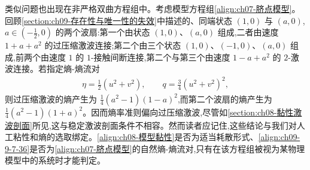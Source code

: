 \documentclass[../../main.tex]{subfiles}
\begin{document}
类似问题也出现在非严格双曲方程组中。考虑模型方程组\eqref{align:ch07-脐点模型}。回顾\cref{section:ch09-存在性与唯一性的失效}中描述的、同端状态 $(1,0)$ 与 $(a,0)$, $a\in(-\frac{1}{2},0)$ 的两个波扇:第一个由状态 $(1,0)$、$(a,0)$ 组成,二者由速度 $1+a+a^{2}$ 的过压缩激波连接;第二个由三个状态 $(1,0)$、$(-1,0)$、$(a,0)$ 组成,前两个由速度 $1$ 的 $1$-接触间断连接,第二个与第三个由速度 $1-a+a^{2}$ 的 $2$-激波连接。若指定熵-熵流对
\begin{align}
\eta=\tfrac{1}{2}(u^{2}+v^{2}),\qquad q=\tfrac{3}{4}(u^{2}+v^{2})^{2},
\label{align:ch09-9-7-36}
\end{align}
则过压缩激波的熵产生为 $\frac{1}{4}(a^{2}-1)(1-a)^{2}$,而第二个波扇的熵产生为 $\frac{1}{4}(a^{2}-1)(1+a)^{2}$。因而熵率准则偏向过压缩激波,尽管如\cref{section:ch08-黏性激波剖面}所见,这与稳定激波剖面条件不相容。然而读者应记住,这些结论与我们对人工粘性和熵的选取绑定。\eqref{align:ch08-模型黏性}是否为适当耗散形式、\eqref{align:ch09-9-7-36}是否为\eqref{align:ch07-脐点模型}的自然熵-熵流对,只有在该方程组被视为某物理模型中的系统时才能判定。
\end{document}
